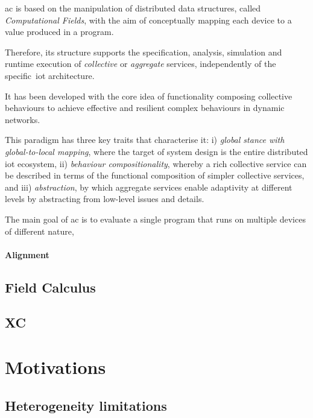 \ac{ac} is based on the manipulation of distributed data structures, called \textit{Computational Fields},
with the aim of conceptually mapping each device to a value produced in a program.

Therefore, its structure supports the specification, analysis, simulation and runtime execution of \textit{collective}
or \textit{aggregate} services, independently of the specific~\ac{iot} architecture.

It has been developed with the core idea of functionality composing collective behaviours to achieve effective and resilient
complex behaviours in dynamic networks.

This paradigm has three key traits that characterise it:
    i) \textit{global stance with global-to-local mapping}, where the target of system design is the entire distributed
        \ac{iot} ecosystem,
    ii) \textit{behaviour compositionality}, whereby a rich collective service can be described in terms of the functional
        composition of simpler collective services, and
    iii) \textit{abstraction}, by which aggregate services enable adaptivity at different levels by abstracting from low-level
        issues and details.


The main goal of \ac{ac} is to evaluate a single program that runs on multiple devices of different nature,

\paragraph{Alignment}

\subsection{Field Calculus}
\label{subsec:field-calculus}

\subsection{XC}
\label{subsec:xc}


\section{Motivations}
\label{sec:motivations}

\subsection{Heterogeneity limitations}
\label{subsec:heterogeneity-limitations}

